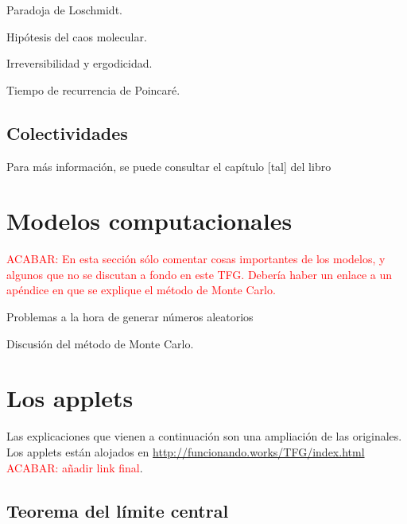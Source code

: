 \documentclass[11pt, a4paper]{article} %
\theoremstyle{named}
\begin{document}
    Paradoja de Loschmidt.


    Hipótesis del caos molecular.

    Irreversibilidad y ergodicidad.

    Tiempo de recurrencia de Poincaré.

    \subsection{Colectividades}

    \cite{cineticos}

    Para más información, se puede consultar el capítulo [tal] del libro \cite{}

\section{Modelos computacionales}

    \textcolor{red}{ACABAR: En esta sección sólo comentar cosas importantes de los modelos, y algunos que no se discutan a fondo en este TFG. Debería haber un enlace a un apéndice en que se explique el método de Monte Carlo.}

    Problemas a la hora de generar números aleatorios

    Discusión del método de Monte Carlo.

\newpage
\section{Los applets}\label{sec:apps}


    Las explicaciones que vienen a continuación son una ampliación de las originales. Los applets están alojados en \url{http://funcionando.works/TFG/index.html} \textcolor{red}{ACABAR: añadir link final}.

    \subsection{Teorema del límite central}\label{sec:central}
\end{document}

